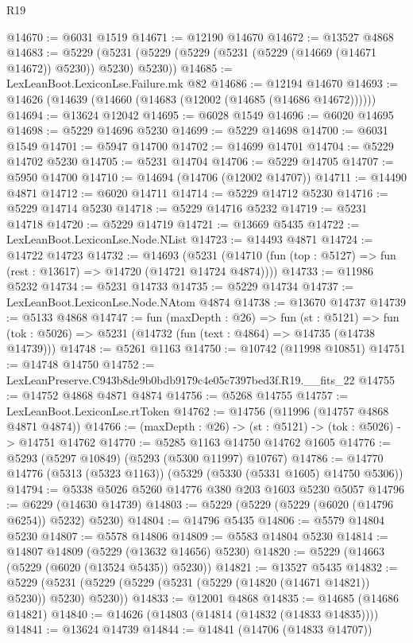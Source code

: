 \begin{lexlean}{R19}
\begin{coremodule}
@14670 := @6031 @1519
@14671 := @12190 @14670
@14672 := @13527 @4868
@14683 := @5229 (@5231 (@5229 (@5229 (@5231 (@5229 (@14669 (@14671 @14672)) @5230)) @5230) @5230))
@14685 := LexLeanBoot.LexiconLse.Failure.mk @82
@14686 := @12194 @14670
@14693 := @14626 (@14639 (@14660 (@14683 (@12002 (@14685 (@14686 @14672))))))
@14694 := @13624 @12042
@14695 := @6028 @1549
@14696 := @6020 @14695
@14698 := @5229 @14696 @5230
@14699 := @5229 @14698
@14700 := @6031 @1549
@14701 := @5947 @14700
@14702 := @14699 @14701
@14704 := @5229 @14702 @5230
@14705 := @5231 @14704
@14706 := @5229 @14705
@14707 := @5950 @14700
@14710 := @14694 (@14706 (@12002 @14707))
@14711 := @14490 @4871
@14712 := @6020 @14711
@14714 := @5229 @14712 @5230
@14716 := @5229 @14714 @5230
@14718 := @5229 @14716 @5232
@14719 := @5231 @14718
@14720 := @5229 @14719
@14721 := @13669 @5435
@14722 := LexLeanBoot.LexiconLse.Node.NList
@14723 := @14493 @4871
@14724 := @14722 @14723
@14732 := @14693
    (@5231 (@14710 (fun (top : @5127) => fun (rest : @13617) => @14720 (@14721 @14724 @4874))))
@14733 := @11986 @5232
@14734 := @5231 @14733
@14735 := @5229 @14734
@14737 := LexLeanBoot.LexiconLse.Node.NAtom @4874
@14738 := @13670 @14737
@14739 := @5133 @4868
@14747 := fun (maxDepth : @26) =>
  fun (st : @5121) =>
  fun (tok : @5026) => @5231 (@14732 (fun (text : @4864) => @14735 (@14738 @14739)))
@14748 := @5261 @1163
@14750 := @10742 (@11998 @10851)
@14751 := @14748 @14750
@14752 := LexLeanPreserve.C943b8de9b0bdb9179c4e05c7397bed3f.R19.__fits_22
@14755 := @14752 @4868 @4871 @4874
@14756 := @5268 @14755
@14757 := LexLeanBoot.LexiconLse.rtToken
@14762 := @14756 (@11996 (@14757 @4868 @4871 @4874))
@14766 := (maxDepth : @26) -> (st : @5121) -> (tok : @5026) -> @14751 @14762
@14770 := @5285 @1163 @14750 @14762 @1605
@14776 := @5293 (@5297 @10849) (@5293 (@5300 @11997) @10767)
@14786 := @14770 @14776 (@5313 (@5323 @1163)) (@5329 (@5330 (@5331 @1605) @14750 @5306))
@14794 := @5338 @5026 @5260 @14776 @380 @203 @1603 @5230 @5057
@14796 := @6229 (@14630 @14739)
@14803 := @5229 (@5229 (@5229 (@6020 (@14796 @6254)) @5232) @5230)
@14804 := @14796 @5435
@14806 := @5579 @14804 @5230
@14807 := @5578 @14806
@14809 := @5583 @14804 @5230
@14814 := @14807 @14809 (@5229 (@13632 @14656) @5230)
@14820 := @5229 (@14663 (@5229 (@6020 (@13524 @5435)) @5230))
@14821 := @13527 @5435
@14832 := @5229 (@5231 (@5229 (@5229 (@5231 (@5229 (@14820 (@14671 @14821)) @5230)) @5230) @5230))
@14833 := @12001 @4868
@14835 := @14685 (@14686 @14821)
@14840 := @14626 (@14803 (@14814 (@14832 (@14833 @14835))))
@14841 := @13624 @14739
@14844 := @14841 (@14706 (@14833 @14707))

\end{coremodule}
\end{lexlean}
